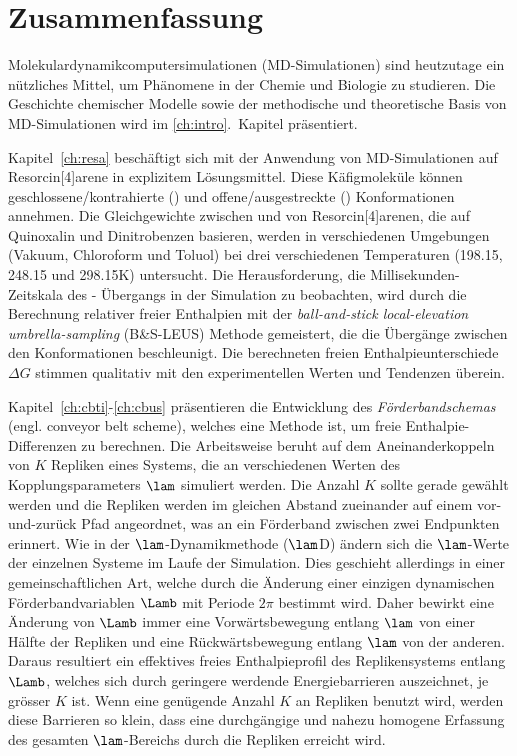 \chapter{Zusammenfassung}

Molekulardynamikcomputersimulationen (MD-\-Simulationen) sind 
heutzutage ein n\"utzliches Mittel, um Ph\"{a}nomene 
in der Chemie und Biologie zu studieren.
%
Die Geschichte chemischer Modelle sowie der methodische
und theoretische Basis von MD-Simulationen wird
im \ref{ch:intro}.~Kapitel pr\"{a}sentiert.

Kapitel~\ref{ch:resa} besch\"{a}ftigt sich mit
der Anwendung von MD-Simulationen auf Resorcin[4]arene in explizitem 
L\"{o}sungsmittel. Diese K\"{a}figmolek\"{u}le k\"{o}nnen
geschlossene/kontrahierte (\vase{}) und
offene/ausgestreckte (\kite{}) Konformationen annehmen.
%
Die Gleichgewichte zwischen \vase{} und \kite{} von Resorcin[4]arenen,
die auf Quinoxalin und Dinitrobenzen basieren, werden in verschiedenen
Umgebungen (Vakuum, Chloroform und Toluol) bei drei verschiedenen
Temperaturen (198.15, 248.15 und 298.15\unit{K}) untersucht.
%
Die Herausforderung, die Millisekunden-Zeitskala des \vase{}-\kite{}
\"Ubergangs in der Simulation zu beobachten, wird durch die Berechnung
relativer freier Enthalpien mit der \textit{ball-and-stick local-elevation 
umbrella-sampling} (B\&S-LEUS)
Methode gemeistert, die die \"{U}berg\"ange zwischen den Konformationen 
beschleunigt. Die berechneten freien Enthalpieunterschiede $\Delta G$
stimmen qualitativ mit den experimentellen Werten und Tendenzen \"uberein.


Kapitel~\ref{ch:cbti}-\ref{ch:cbus} pr\"{a}sentieren die Entwicklung
des \textit{F\"orderbandschemas} (engl. conveyor belt scheme), welches
eine Methode ist, um freie Enthalpie-Differenzen zu berechnen.
%
Die Arbeitsweise beruht auf dem Aneinanderkoppeln von $K$ Repliken eines Systems,
die an verschiedenen Werten des Kopplungsparameters $\lam$ simuliert werden.
%
Die Anzahl $K$ sollte gerade gew\"ahlt werden und die Repliken werden
im gleichen Abstand zueinander auf einem vor-und-zur\"uck Pfad angeordnet, was an ein F\"orderband
zwischen zwei Endpunkten erinnert.
%
Wie in der $\lam$-Dynamikmethode ($\lam$D) \"andern sich die $\lam$-Werte der einzelnen 
Systeme im Laufe der Simulation.
%
Dies geschieht allerdings in einer gemeinschaftlichen Art, welche durch die \"Anderung 
einer einzigen dynamischen F\"orderbandvariablen $\Lamb$ mit Periode $2\pi$ bestimmt wird.
%
Daher bewirkt eine \"Anderung von $\Lamb$ immer eine Vorw\"artsbewegung entlang $\lam$ von einer H\"alfte der Repliken und eine R\"uckw\"artsbewegung entlang $\lam$ von der anderen.
%
Daraus resultiert ein effektives freies Enthalpieprofil des Replikensystems entlang $\Lamb$,
welches sich durch geringere werdende Energiebarrieren auszeichnet, je gr\"osser $K$ ist.
%
Wenn eine gen\"ugende Anzahl $K$ an Repliken benutzt wird, werden diese Barrieren so klein,
dass eine durchg\"angige und nahezu homogene Erfassung des gesamten $\lam$-Bereichs durch die 
Repliken erreicht wird.

